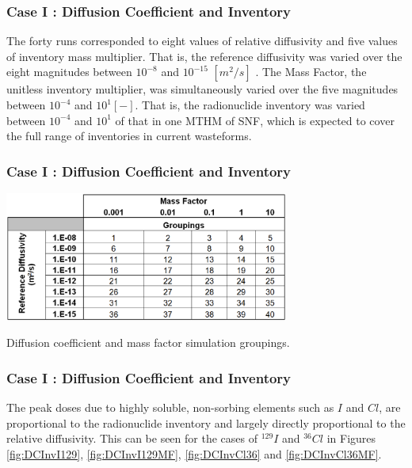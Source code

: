 \begin{frame}[c]
  \frametitle{Case I : Diffusion Coefficient and Inventory}
The forty runs corresponded to eight values of relative diffusivity and five 
values of inventory mass multiplier. That is, the reference diffusivity was varied over the 
eight magnitudes between $ 10^{-8}$ and $10^{-15}$ $[m^2 /s]$ . 
The Mass Factor, the unitless inventory multiplier, was simultaneously varied over 
the five magnitudes between $10^{-4}$ and $10^{1} [-]$. That is, the 
radionuclide inventory was varied between $10^{-4}$ and $10^{1}$ of that in one 
\gls{MTHM} of \gls{SNF}, which is expected to cover the full range of 
inventories in current wasteforms.

\begin{frame}[c]
  \frametitle{Case I : Diffusion Coefficient and Inventory}
\begin{table}[hbp!]
\centering
\includegraphics[width=0.7\textwidth]{DiffCoeffAndInvEBSFail/DiffCoeffAndInvGroups.eps}
\caption{Diffusion coefficient and mass factor simulation groupings.}
\label{tab:DiffCoeffAndInvGroups}
\end{table}
\end{frame}

\begin{frame}[c]
  \frametitle{Case I : Diffusion Coefficient and Inventory}
The peak doses due to highly soluble, non-sorbing elements such as $I$ and $Cl$, 
are  proportional to the radionuclide inventory and 
largely directly proportional to the relative diffusivity. This can be seen for 
the cases of $^{129}I$ and $^{36}Cl$ in Figures \ref{fig:DCInvI129}, 
\ref{fig:DCInvI129MF}, \ref{fig:DCInvCl36} and \ref{fig:DCInvCl36MF}.
\end{frame}




\end{frame}
